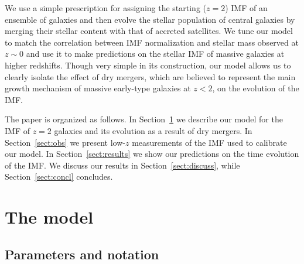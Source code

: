 \documentclass[usenatbib]{mnras}
\def\Sref#1{Section~\ref{#1}\xspace}
\begin{document}
We use a simple prescription for assigning the starting ($z=2$)
  IMF of an ensemble of galaxies and then evolve the stellar
population of central galaxies by merging their stellar content with
that of accreted satellites. We tune our model to match the
  correlation between IMF normalization and stellar mass observed at
  $z\sim0$ and use it to make predictions on the stellar IMF of
  massive galaxies at higher redshifts. Though very simple in its
construction, our model allows us to clearly isolate the effect of dry
mergers, which are believed to represent the main growth mechanism of
massive early-type galaxies at $z < 2$, on the evolution of the IMF.


The paper is organized as follows.  In \Sref{sect:model} we describe
our model for the IMF of $z=2$ galaxies and its evolution as a result
of dry mergers.  In \Sref{sect:obs} we present low-$z$ measurements of
the IMF used to calibrate our model.  In \Sref{sect:results} we show
our predictions on the time evolution of the IMF.  We discuss our
results in \Sref{sect:discuss}, while \Sref{sect:concl}
concludes.


\section{The model}\label{sect:model}

\subsection{Parameters and notation}
\end{document}
